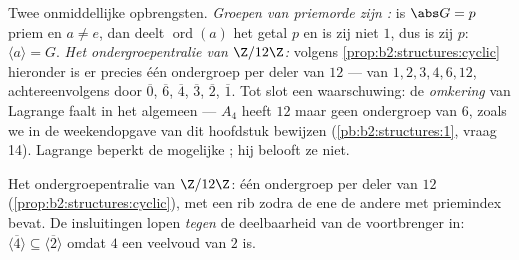 \begin{example}\label{ex:b2:structures:lagrangeapp}
Twee onmiddellijke opbrengsten. \emph{Groepen van priemorde zijn
:} is $\abs G = p$ priem en $a \neq e$, dan deelt
$\operatorname{ord}(a)$ het getal $p$ en is zij niet $1$, dus is
zij $p$: $\langle a\rangle = G$. \emph{Het ondergroepentralie van
$\Z/12\Z$:} volgens \cref{prop:b2:structures:cyclic} hieronder is
er precies één ondergroep per deler van $12$ --- van  $1, 2,
3, 4, 6, 12$, achtereenvolgens  door $\overline 0$,
$\overline 6$, $\overline 4$, $\overline 3$, $\overline 2$,
$\overline 1$. Tot slot een waarschuwing: de \emph{omkering} van
Lagrange faalt in het algemeen --- $A_4$ heeft  $12$ maar
geen ondergroep van  $6$, zoals we in de weekendopgave van
dit hoofdstuk bewijzen (\cref{pb:b2:structures:1}, vraag 14).
Lagrange beperkt de mogelijke ; hij belooft ze niet.
\end{example}

\begin{omfigure}

{\small Het ondergroepentralie van $\Z/12\Z$: één ondergroep per
deler van $12$ (\cref{prop:b2:structures:cyclic}), met een rib
zodra de ene de andere met priemindex bevat. De insluitingen lopen
\emph{tegen} de deelbaarheid van de voortbrenger in: $\langle
\overline4\rangle \subseteq \langle\overline2\rangle$ omdat $4$
een veelvoud van $2$ is.}
\end{omfigure}

